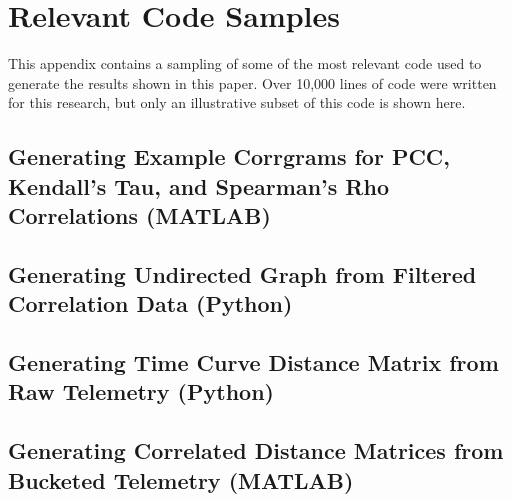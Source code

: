 \chapter{Relevant Code Samples}

This appendix contains a sampling of some of the most relevant code used to generate the results shown in this paper. Over 10,000 lines of code were written for this research, but only an illustrative subset of this code is shown here.

\section{Generating Example Corrgrams for PCC, Kendall's Tau, and Spearman's Rho Correlations (MATLAB)}



\section{Generating Undirected Graph from Filtered Correlation Data (Python)}



\section{Generating Time Curve Distance Matrix from Raw Telemetry (Python)}



\section{Generating Correlated Distance Matrices from Bucketed Telemetry (MATLAB)}

